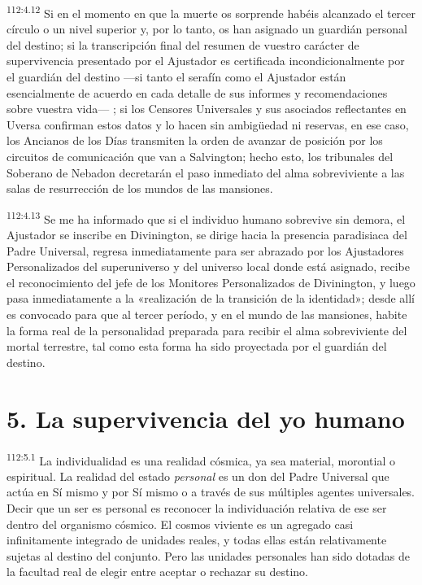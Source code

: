 \par
\textsuperscript{112:4.12} Si en el momento en que la muerte os sorprende habéis alcanzado el tercer círculo o un nivel superior y, por lo tanto, os han asignado un guardián personal del destino; si la transcripción final del resumen de vuestro carácter de supervivencia presentado por el Ajustador es certificada incondicionalmente por el guardián del destino ---si tanto el serafín como el Ajustador están esencialmente de acuerdo en cada detalle de sus informes y recomendaciones sobre vuestra vida--- ; si los Censores Universales y sus asociados reflectantes en Uversa confirman estos datos y lo hacen sin ambig\"uedad ni reservas, en ese caso, los Ancianos de los Días transmiten la orden de avanzar de posición por los circuitos de comunicación que van a Salvington; hecho esto, los tribunales del Soberano de Nebadon decretarán el paso inmediato del alma sobreviviente a las salas de resurrección de los mundos de las mansiones.

\par
\textsuperscript{112:4.13} Se me ha informado que si el individuo humano sobrevive sin demora, el Ajustador se inscribe en Divinington, se dirige hacia la presencia paradisiaca del Padre Universal, regresa inmediatamente para ser abrazado por los Ajustadores Personalizados del superuniverso y del universo local donde está asignado, recibe el reconocimiento del jefe de los Monitores Personalizados de Divinington, y luego pasa inmediatamente a la «realización de la transición de la identidad»; desde allí es convocado para que al tercer período, y en el mundo de las mansiones, habite la forma real de la personalidad preparada para recibir el alma sobreviviente del mortal terrestre, tal como esta forma ha sido proyectada por el guardián del destino.

\section*{5. La supervivencia del yo humano}
\par
\textsuperscript{112:5.1} La individualidad es una realidad cósmica, ya sea material, morontial o espiritual. La realidad del estado \textit{personal} es un don del Padre Universal que actúa en Sí mismo y por Sí mismo o a través de sus múltiples agentes universales. Decir que un ser es personal es reconocer la individuación relativa de ese ser dentro del organismo cósmico. El cosmos viviente es un agregado casi infinitamente integrado de unidades reales, y todas ellas están relativamente sujetas al destino del conjunto. Pero las unidades personales han sido dotadas de la facultad real de elegir entre aceptar o rechazar su destino.

